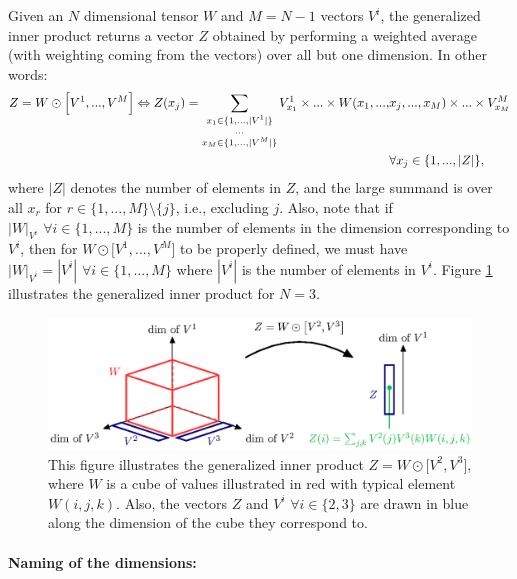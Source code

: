 \documentclass[twoside,11pt]{article}
\begin{document}
Given an $N$ dimensional tensor $W$ and $M = N - 1$ vectors $V^i$, the generalized inner product returns a vector $Z$ obtained by performing a weighted average (with weighting coming from the vectors) over all but one dimension. In other words:
\begin{align*}
Z = W \odot \Big[ V^1, ..., V^{M}\Big] \Leftrightarrow Z(x_j) = \sum_{\substack{x_1 \in \{1, ..., |V^1|\}\\
{\color{white}\}}...{\color{white}\}}\\
x_M \in \{1, ..., |V^M|\} }} V^1_{x_1} \times ... \times W(x_1, ..., & x_j, ..., x_{M}) \times ... \times V^{M}_{x_{M}}\\
& \forall x_j \in \{1, ..., |Z|\},
\end{align*}
where $|Z|$ denotes the number of elements in $Z$, and the large summand is over all $x_r$ for $r \in \{1, ..., M\} \setminus \{j\}$, i.e., excluding $j$. Also, note that if $|W|_{V^i} \,\, \forall i \in \{1, ..., M\}$ is the number of elements in the dimension corresponding to $V^i$, then for $W \odot \big[ V^1, ..., V^{M}\big]$ to be properly defined, we must have $|W|_{V^i} = |V^i| \,\, \forall i \in \{1, ..., M\}$ where $|V^i|$ is the number of elements in $V^i$. Figure \ref{fig:inner-product} illustrates the generalized inner product for $N = 3$.

\begin{figure}[H]
	\begin{center}
	\includegraphics[scale=0.8]{BTAI-figure8}
	\end{center}
  \caption{This figure illustrates the generalized inner product $Z = W \odot \big[ V^2, V^3 \big]$, where $W$ is a cube of values illustrated in red with typical element $W(i,j,k)$. Also, the vectors $Z$ and $V^i \,\, \forall i \in \{2,3\}$ are drawn in blue along the dimension of the cube they correspond to.}
   \label{fig:inner-product}
\end{figure}

\paragraph{Naming of the dimensions:}
\end{document}

